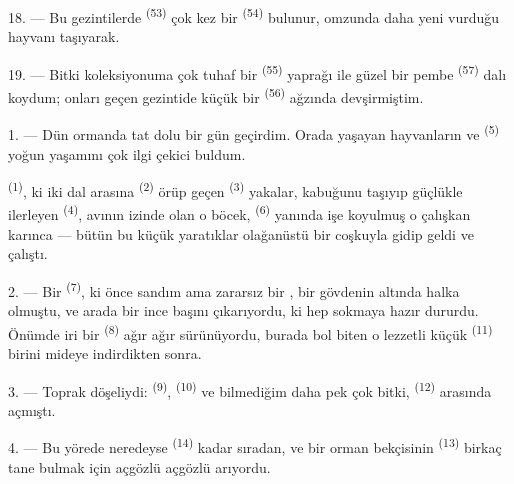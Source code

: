 18. --- Bu gezintilerde  \textsuperscript{(53)} çok kez bir
 \textsuperscript{(54)} bulunur, omzunda daha yeni
vurduğu hayvanı taşıyarak.

19. --- Bitki koleksiyonuma çok tuhaf bir 
\textsuperscript{(55)} yaprağı ile güzel bir pembe 
\textsuperscript{(57)} dalı koydum; onları geçen gezintide küçük bir
 \textsuperscript{(56)} ağzında devşirmiştim.

\VUsaut{3.0mm}
\VUsaut{3.0mm}

\VUsaut{3.0mm}

1. --- Dün ormanda tat dolu bir gün geçirdim. Orada yaşayan hayvanların ve
 \textsuperscript{(5)} yoğun yaşamını çok ilgi çekici
buldum.

 \textsuperscript{(1)}, ki iki dal arasına 
\textsuperscript{(2)} örüp geçen  \textsuperscript{(3)}
yakalar, kabuğunu taşıyıp güçlükle ilerleyen 
\textsuperscript{(4)}, avının izinde olan o böcek, 
\textsuperscript{(6)} yanında işe koyulmuş o çalışkan karınca --- bütün bu
küçük yaratıklar olağanüstü bir coşkuyla gidip geldi ve çalıştı.

2. --- Bir  \textsuperscript{(7)}, ki önce 
sandım ama zararsız bir , bir gövdenin altında halka
olmuştu, ve arada bir ince başını çıkarıyordu, ki hep sokmaya hazır dururdu.
Önümde iri bir  \textsuperscript{(8)} ağır ağır
sürünüyordu, burada bol biten o lezzetli küçük 
\textsuperscript{(11)} birini mideye indirdikten sonra.

3. --- Toprak  döşeliydi: 
\textsuperscript{(9)},  \textsuperscript{(10)} ve
bilmediğim daha pek çok bitki, 
\textsuperscript{(12)} arasında açmıştı.

4. --- Bu yörede  neredeyse 
\textsuperscript{(14)} kadar sıradan, ve bir orman bekçisinin
 \textsuperscript{(13)} birkaç tane bulmak için açgözlü
açgözlü arıyordu.

\VUsaut{3.0mm}
\VUsaut{3.0mm}

